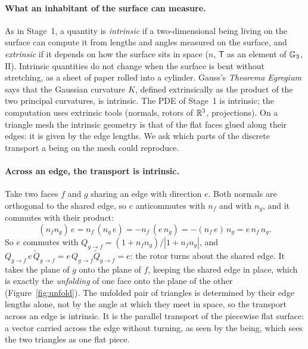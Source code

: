 \paragraph{What an inhabitant of the surface can measure.} As in Stage~1, a quantity is \emph{intrinsic} if a two-dimensional being living on the surface can compute it from lengths and angles measured on the surface, and \emph{extrinsic} if it depends on how the surface sits in space ($n$, $\mathsf T$ as an element of $\mathbb{G}_3$, $\mathrm{II}$). Intrinsic quantities do not change when the surface is bent without stretching, as a sheet of paper rolled into a cylinder. Gauss's \emph{Theorema Egregium} says that the Gaussian curvature $K$, defined extrinsically as the product of the two principal curvatures, is intrinsic. The PDE of Stage~1 is intrinsic; the computation uses extrinsic tools (normals, rotors of $\mathbb{R}^3$, projections). On a triangle mesh the intrinsic geometry is that of the flat faces glued along their edges: it is given by the edge lengths. We ask which parts of the discrete transport a being on the mesh could reproduce.

\paragraph{Across an edge, the transport is intrinsic.} Take two faces $f$ and $g$ sharing an edge with direction $e$. Both normals are orthogonal to the shared edge, so $e$ anticommutes with $n_f$ and with $n_g$, and it commutes with their product:
\begin{equation*}
(n_f n_g)\, e = n_f\,(n_g\, e) = -n_f\,(e\, n_g) = -(n_f\, e)\, n_g = e\, n_f\, n_g .
\end{equation*}
So $e$ commutes with $Q_{g\to f} = (1 + n_fn_g)/|1 + n_fn_g|$, and $Q_{g\to f}\, e\,\widetilde Q_{g\to f} = e\, Q_{g\to f}\widetilde Q_{g\to f} = e$: the rotor turns about the shared edge. It takes the plane of $g$ onto the plane of $f$, keeping the shared edge in place, which is exactly the \emph{unfolding} of one face onto the plane of the other (Figure~\ref{fig:unfold}). The unfolded pair of triangles is determined by their edge lengths alone, not by the angle at which they meet in space, so the transport across an edge is intrinsic. It is the parallel transport of the piecewise flat surface: a vector carried across the edge without turning, as seen by the being, which sees the two triangles as one flat piece.

